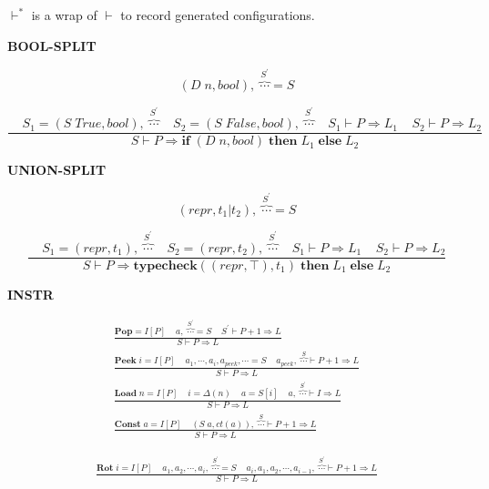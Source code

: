 \documentclass[12pt, a4paper]{report}
\newcommand{\rulegroup}[1]{
    \textbf{#1}
}
\newcommand{\gap}{ \;\;\;\; }
\begin{document}
$\vdash^{*}$ is a wrap of $\vdash$ to record generated configurations.

\newpage

\rulegroup{BOOL-SPLIT}
\vspace*{\baselineskip}


$$
(D\; n, bool), \; \overbrace{\cdots}^{S^{'}}  = S
$$

\vspace*{-1.5\baselineskip}
$$
\dfrac{
    \gap
    S_1 = (S\;True, bool), \; \overbrace{\cdots}^{S^{'}}
    \gap
    S_2 = (S\;False, bool), \; \overbrace{\cdots}^{S^{'}}
    \gap
    S_1 \vdash P \Rightarrow L_1
    \gap
    S_2 \vdash P \Rightarrow L_2
}{
    S \vdash P \Rightarrow \mathbf{if} \; (D\; n, bool) \; \mathbf{then} \; L_1 \; \mathbf{else} \; L_2
}
$$


\rulegroup{UNION-SPLIT}

$$
(repr, t_1 | t_2), \; \overbrace{\cdots}^{S^{'}}  = S
$$

\vspace*{-1.5\baselineskip}
$$
\dfrac{
    \gap
    S_1 = (repr, t_1), \; \overbrace{\cdots}^{S^{'}}
    \gap
    S_2 = (repr, t_2), \; \overbrace{\cdots}^{S^{'}}
    \gap
    S_1 \vdash P \Rightarrow L_1
    \gap
    S_2 \vdash P \Rightarrow L_2
}{
    S \vdash P \Rightarrow  \mathbf{typecheck}((repr, \top), t_1) \; \mathbf{then} \; L_1 \; \mathbf{else} \; L_2
}
$$


\rulegroup{INSTR}

\begin{equation*}
\begin{split}
\frac{
    \mathbf{Pop} = I[P] \gap
    a , \; \overbrace{\cdots}^{S^{'}} = S \gap
    S^{'} \vdash P+1 \Rightarrow L
}{
    S \vdash P \Rightarrow L
}
\\
\frac{
    \mathbf{Peek}\; i = I[P] \gap
    a_1, \cdots, a_i, a_{peek}, \cdots = S \;\;\;\;
    a_{peek}, \; \overbrace{\cdots}^{S}  \vdash P + 1 \Rightarrow L
}{
    S \vdash P \Rightarrow L
}
\\
\frac{\mathbf{Load}\; n = I[P] \gap i = \Delta(n) \gap a = S[i] \gap a, \; \overbrace{\cdots}^{S^{'}} \vdash I \Rightarrow L }
     {S \vdash P  \Rightarrow L }
\;\;
\\
\frac{ \mathbf{Const}\; a = I[P] \gap (S\;a, ct(a)), \; \overbrace{\cdots}^{S} \vdash P + 1 \Rightarrow L  }
       { S \vdash P \Rightarrow L }
\end{split}
\end{equation*}

\begin{equation*}
\begin{split}
\frac{
    \mathbf{Rot} \; i = I[P]
    \gap
    a_1, a_2, \cdots, a_i, \; \overbrace{\cdots}^{S^{'}} = S
    \gap
    a_i, a_1, a_2, \cdots, a_{i - 1},\; \overbrace{\cdots}^{S^{'}} \vdash P + 1 \Rightarrow L
}{
    S \vdash P \Rightarrow L
}
\end{split}
\end{equation*}
\end{document}
